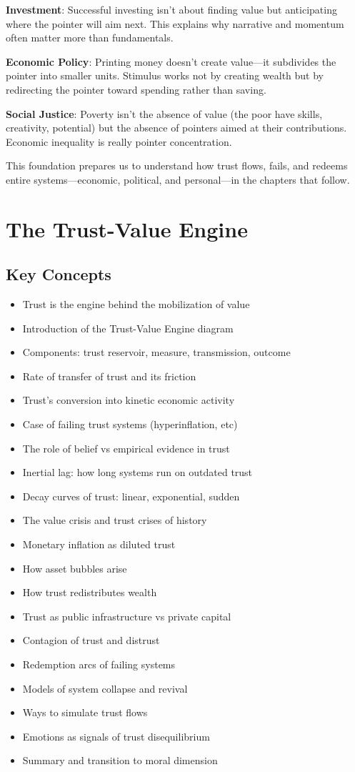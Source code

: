 \documentclass[11pt,oneside]{book}
\begin{document}
\textbf{Investment}: Successful investing isn't about finding value but anticipating where the pointer will aim next. This explains why narrative and momentum often matter more than fundamentals.

\textbf{Economic Policy}: Printing money doesn't create value—it subdivides the pointer into smaller units. Stimulus works not by creating wealth but by redirecting the pointer toward spending rather than saving.

\textbf{Social Justice}: Poverty isn't the absence of value (the poor have skills, creativity, potential) but the absence of pointers aimed at their contributions. Economic inequality is really pointer concentration.

This foundation prepares us to understand how trust flows, fails, and redeems entire systems—economic, political, and personal—in the chapters that follow.


\chapter{ The Trust-Value Engine}

\section{Key Concepts}

\begin{itemize}
\item Trust is the engine behind the mobilization of value
\item Introduction of the Trust-Value Engine diagram
\item Components: trust reservoir, measure, transmission, outcome
\item Rate of transfer of trust and its friction
\item Trust's conversion into kinetic economic activity
\item Case of failing trust systems (hyperinflation, etc)
\item The role of belief vs empirical evidence in trust
\item Inertial lag: how long systems run on outdated trust
\item Decay curves of trust: linear, exponential, sudden
\item The value crisis and trust crises of history
\item Monetary inflation as diluted trust
\item How asset bubbles arise
\item How trust redistributes wealth
\item Trust as public infrastructure vs private capital
\item Contagion of trust and distrust
\item Redemption arcs of failing systems
\item Models of system collapse and revival
\item Ways to simulate trust flows
\item Emotions as signals of trust disequilibrium
\item Summary and transition to moral dimension
\end{itemize}
\end{document}

